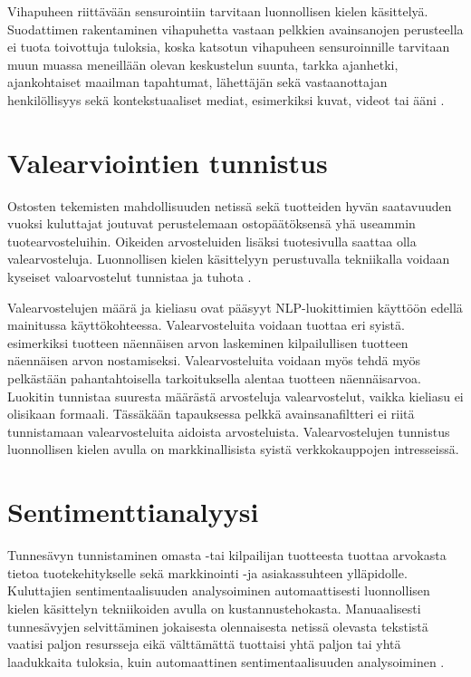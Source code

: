Vihapuheen riittävään sensurointiin tarvitaan luonnollisen kielen käsittelyä. Suodattimen rakentaminen vihapuhetta vastaan pelkkien avainsanojen perusteella ei tuota toivottuja tuloksia, koska katsotun vihapuheen sensuroinnille tarvitaan muun muassa meneillään olevan keskustelun suunta, tarkka ajanhetki, ajankohtaiset maailman tapahtumat, lähettäjän sekä vastaanottajan henkilöllisyys sekä kontekstuaaliset mediat, esimerkiksi kuvat, videot tai ääni \citep{hate}.

\section{Valearviointien tunnistus}
Ostosten tekemisten mahdollisuuden netissä sekä tuotteiden hyvän saatavuuden vuoksi kuluttajat joutuvat perustelemaan ostopäätöksensä yhä useammin tuotearvosteluihin. Oikeiden arvosteluiden lisäksi tuotesivulla saattaa olla valearvosteluja. Luonnollisen kielen käsittelyyn perustuvalla tekniikalla voidaan kyseiset valoarvostelut tunnistaa ja tuhota \citep{falsereview}.

Valearvostelujen määrä ja kieliasu ovat pääsyyt NLP-luokittimien käyttöön edellä mainitussa käyttökohteessa. Valearvosteluita voidaan tuottaa eri syistä. esimerkiksi tuotteen näennäisen arvon laskeminen kilpailullisen tuotteen näennäisen arvon nostamiseksi.  Valearvosteluita voidaan myös tehdä myös pelkästään pahantahtoisella tarkoituksella alentaa tuotteen näennäisarvoa. Luokitin tunnistaa suuresta määrästä arvosteluja valearvostelut, vaikka kieliasu ei olisikaan formaali. Tässäkään tapauksessa pelkkä avainsanafiltteri ei riitä tunnistamaan valearvosteluita aidoista arvosteluista. Valearvostelujen tunnistus luonnollisen kielen avulla on markkinallisista syistä verkkokauppojen intresseissä.

\section{Sentimenttianalyysi}

Tunnesävyn tunnistaminen omasta -tai kilpailijan tuotteesta tuottaa arvokasta tietoa tuotekehitykselle sekä markkinointi -ja asiakassuhteen ylläpidolle. Kuluttajien sentimentaalisuuden analysoiminen automaattisesti luonnollisen kielen käsittelyn tekniikoiden avulla on kustannustehokasta. Manuaalisesti tunnesävyjen selvittäminen jokaisesta olennaisesta netissä olevasta tekstistä vaatisi paljon resursseja eikä välttämättä tuottaisi yhtä paljon tai yhtä laadukkaita tuloksia, kuin automaattinen sentimentaalisuuden analysoiminen \citep{sentimentality}.


